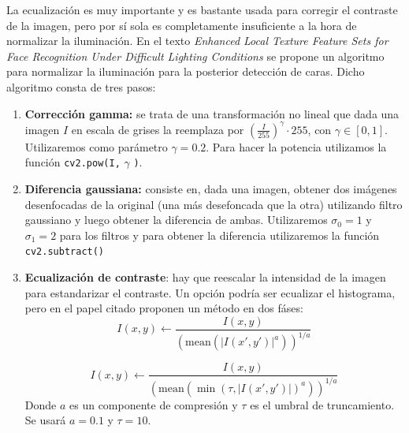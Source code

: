\documentclass[a4paper,openright, 12pt]{book}
\begin{document}
La ecualización es muy importante y es bastante usada para corregir el contraste de la imagen, pero por sí sola es completamente insuficiente a la hora de normalizar la iluminación. En el texto \textit{Enhanced Local Texture Feature Sets for Face Recognition Under Difficult Lighting Conditions} \cite{illuFace} se propone un algoritmo para normalizar la iluminación para la posterior detección de caras.
\newline
Dicho algoritmo consta de tres pasos:
\begin{enumerate}
\item \textbf{Corrección gamma:} 
se trata de una transformación no lineal que dada una imagen $I$ en escala de grises la reemplaza por ${(\frac{I}{255})}^{\gamma}\cdot255$, con $\gamma \in [0,1]$. Utilizaremos como parámetro $\gamma = 0.2$. Para hacer la potencia utilizamos la función \lstinline|cv2.pow(I,| $\gamma$ \lstinline|)|.

\item \textbf{Diferencia gaussiana:} consiste en, dada una imagen, obtener dos imágenes desenfocadas de la original (una más desefoncada que la otra) utilizando filtro gaussiano y luego obtener la diferencia de ambas. Utilizaremos $\sigma_0 =1$ y $\sigma_1=2$ para los filtros y para obtener la diferencia utilizaremos la función \lstinline|cv2.subtract()|

\item \textbf{Ecualización de contraste}: hay que reescalar la intensidad de la imagen para estandarizar el contraste. Un opción podría ser ecualizar el histograma, pero en el papel citado proponen un método en dos fáses:
\begin{equation}
I(x,y) \leftarrow \frac{I(x,y)}{ {(\text{mean}(|I(x',y')|^a))}^{1/a}}
\end{equation}

\begin{equation}
I(x,y) \leftarrow \frac{I(x,y)}{ {(\text{mean}({\min(\tau, |I(x',y')|)}^a))}^{1/a}}
\end{equation}
Donde $a$ es un componente de compresión y $\tau$ es el umbral de truncamiento. Se usará $a=0.1$ y $\tau=10$.
\end{enumerate}

\appendix
\end{document}
